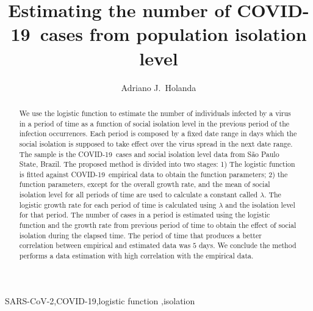 \documentclass[review]{elsarticle}
\def\covid{\hbox{COVID-19}} %
\def\sarscov{{SARS-CoV-2}}
\begin{document}
\begin{frontmatter}

\title{Estimating the number of \covid\ cases from population isolation level}

\author[mymainaddress,mysecondaryaddress]{Adriano J.\ Holanda}

\address[mymainaddress]{Department of Computing and Mathematics - Faculty of Philosophy, Science and Letters at Ribeir\~{a}o Preto - University of S\~{a}o Paulo, Ribeirão Preto, S\~{a}o Paulo, Brazil}
\address[mysecondaryaddress]{Faculty ``Dr.\ Francisco Maeda'', Ituverava, S\~{a}o Paulo, Brazil}


\begin{abstract}
We use the logistic function to estimate the number 
of individuals infected by a virus in a period of time
as a function of social isolation level 
in the previous period of the infection occurrences.
Each period is composed by a fixed date range in days 
which the social isolation is supposed to take
effect over the virus spread in the next 
date range.
The sample is the \covid\ cases and 
social isolation level data from S\~{a}o Paulo State, Brazil.  
The proposed method is divided into two stages: 
1) The logistic function is fitted against \covid\ 
empirical data to obtain the function parameters; 
2) the function parameters, 
 except for the overall growth rate,
 and the mean of social isolation level for all periods of time 
are used to calculate a constant called $\lambda$.
The logistic growth rate for each period of time
is calculated using $\lambda$ 
and the isolation level for that period.
 The number of cases in a period is estimated using 
the logistic function and the growth rate 
from previous period of time 
to obtain the effect of social isolation during the
elapsed time. 
The period of time that produces a 
better correlation between empirical and estimated 
data was $5$ days. 
We conclude the method performs a data estimation with  
 high correlation with the empirical data.
\end{abstract}

\begin{keyword}
\sarscov \sep \covid \sep logistic function \sep isolation
\end{keyword}

\end{frontmatter}
\end{document}
